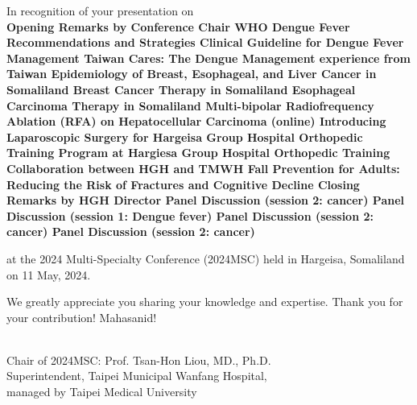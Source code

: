 \documentclass[a4paper, landscape]{article}
\newcommand{\topic}[1]{
\ifcase#1
\or Opening Remarks by Conference Chair
\or WHO Dengue Fever Recommendations and Strategies
\or Clinical Guideline for Dengue Fever Management
\or Taiwan Cares: The Dengue Management experience from Taiwan
\or Epidemiology of Breast, Esophageal, and Liver Cancer in Somaliland
\or Breast Cancer Therapy in Somaliland
\or Esophageal Carcinoma Therapy in Somaliland
\or Multi-bipolar Radiofrequency Ablation (RFA) on Hepatocellular Carcinoma (online)
\or Introducing Laparoscopic Surgery for Hargeisa Group Hospital
\or Orthopedic Training Program at Hargiesa Group Hospital
\or Orthopedic Training Collaboration between HGH and TMWH
\or Fall Prevention for Adults: Reducing the Risk of Fractures and Cognitive Decline
\or Closing Remarks by HGH Director
%
\or Panel Discussion (session 2: cancer)
\or Panel Discussion (session 1: Dengue fever)
\or Panel Discussion (session 2: cancer)
\or Panel Discussion (session 2: cancer)
\fi
}
\begin{document}
{\begin{center}
\begin{flushleft}
In recognition of your presentation on\\

\textbf{\topic{\x}}

\vspace{0.5cm} 

at the 2024 Multi-Specialty Conference (2024MSC) held in Hargeisa, Somaliland on 11 May, 2024.


We greatly appreciate you sharing your knowledge and expertise. Thank you for your contribution! Mahasanid!

\end{flushleft}\\[0.5cm]



\large
Chair of 2024MSC: Prof. Tsan-Hon Liou, MD., Ph.D.\\
Superintendent, Taipei Municipal Wanfang Hospital, \\
managed by Taipei Medical University


\end{center}



\clearpage


} %




\end{document}
